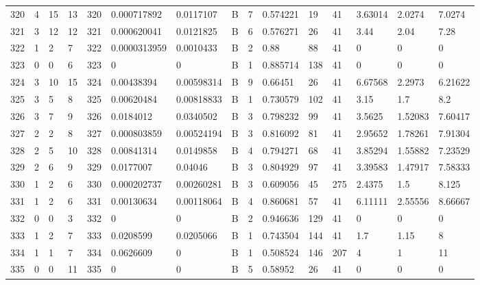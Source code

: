 \begin{latin}
\begin{longtable}{lllllllllllllll}
	320 & 4  & 15  & 13 & 320 & 0.000717892    & 0.0117107      & B & 7  & 0.574221 & 19   & 41   & 3.63014 & 2.0274  & 7.0274  \\
	321 & 3  & 12  & 12 & 321 & 0.000620041    & 0.0121825      & B & 6  & 0.576271 & 26   & 41   & 3.44    & 2.04    & 7.28    \\
	322 & 1  & 2   & 7  & 322 & 0.0000313959   & 0.0010433      & B & 2  & 0.88     & 88   & 41   & 0       & 0       & 0       \\
	323 & 0  & 0   & 6  & 323 & 0              & 0              & B & 1  & 0.885714 & 138  & 41   & 0       & 0       & 0       \\
	324 & 3  & 10  & 15 & 324 & 0.00438394     & 0.00598314     & B & 9  & 0.66451  & 26   & 41   & 6.67568 & 2.2973  & 6.21622 \\
	325 & 3  & 5   & 8  & 325 & 0.00620484     & 0.00818833     & B & 1  & 0.730579 & 102  & 41   & 3.15    & 1.7     & 8.2     \\
	326 & 3  & 7   & 9  & 326 & 0.0184012      & 0.0340502      & B & 3  & 0.798232 & 99   & 41   & 3.5625  & 1.52083 & 7.60417 \\
	327 & 2  & 2   & 8  & 327 & 0.000803859    & 0.00524194     & B & 3  & 0.816092 & 81   & 41   & 2.95652 & 1.78261 & 7.91304 \\
	328 & 2  & 5   & 10 & 328 & 0.00841314     & 0.0149858      & B & 4  & 0.794271 & 68   & 41   & 3.85294 & 1.55882 & 7.23529 \\
	329 & 2  & 6   & 9  & 329 & 0.0177007      & 0.04046        & B & 3  & 0.804929 & 97   & 41   & 3.39583 & 1.47917 & 7.58333 \\
	330 & 1  & 2   & 6  & 330 & 0.000202737    & 0.00260281     & B & 3  & 0.609056 & 45   & 275  & 2.4375  & 1.5     & 8.125   \\
	331 & 1  & 2   & 6  & 331 & 0.00130634     & 0.00118064     & B & 4  & 0.860681 & 57   & 41   & 6.11111 & 2.55556 & 8.66667 \\
	332 & 0  & 0   & 3  & 332 & 0              & 0              & B & 2  & 0.946636 & 129  & 41   & 0       & 0       & 0       \\
	333 & 1  & 2   & 7  & 333 & 0.0208599      & 0.0205066      & B & 1  & 0.743504 & 144  & 41   & 1.7     & 1.15    & 8       \\
	334 & 1  & 1   & 7  & 334 & 0.0626609      & 0              & B & 1  & 0.508524 & 146  & 207  & 4       & 1       & 11      \\
	335 & 0  & 0   & 11 & 335 & 0              & 0              & B & 5  & 0.58952  & 26   & 41   & 0       & 0       & 0       \\

\end{longtable}
\end{latin}
